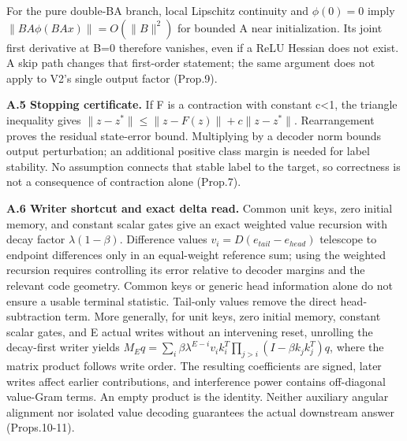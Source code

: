 For the pure double-BA branch, local Lipschitz continuity and \(\phi(0)=0\) imply
\(\|BA\phi(BAx)\|=O(\|B\|^2)\) for bounded A near initialization. Its joint
first derivative at B=0 therefore vanishes, even if a ReLU Hessian does not exist.
A skip path changes that first-order statement; the same argument does not apply
to V2’s single output factor (Prop.9).

\textbf{A.5 Stopping certificate.} If F is a contraction with constant c<1, the
triangle inequality gives
\(\|z-z^*\|\le\|z-F(z)\|+c\|z-z^*\|\).
Rearrangement proves the residual state-error bound. Multiplying by a decoder
norm bounds output perturbation; an additional positive class margin is needed
for label stability. No assumption connects that stable label to the target,
so correctness is not a consequence of contraction alone (Prop.7).

\textbf{A.6 Writer shortcut and exact delta read.} Common unit keys, zero initial
memory, and constant scalar gates give an exact weighted value recursion with
decay factor \(\lambda(1-\beta)\). Difference values
\(v_i=D(e_{tail}-e_{head})\) telescope to endpoint differences only in an equal-weight
reference sum; using the weighted recursion requires controlling its error relative
to decoder margins and the relevant code geometry. Common keys or generic head
information alone do not ensure a usable terminal statistic. Tail-only values
remove the direct head-subtraction term. More generally, for unit keys, zero
initial memory, constant scalar gates, and E actual writes without an intervening
reset, unrolling the decay-first writer yields
\(M_Eq=\sum_i\beta\lambda^{E-i}v_i k_i^T\prod_{j>i}(I-\beta k_jk_j^T)q\),
where the matrix product follows write order. The resulting coefficients are
signed, later writes affect earlier contributions, and interference power
contains off-diagonal value-Gram terms. An empty product is the identity.
Neither auxiliary angular alignment
nor isolated value decoding guarantees the actual downstream answer
(Props.10-11).

